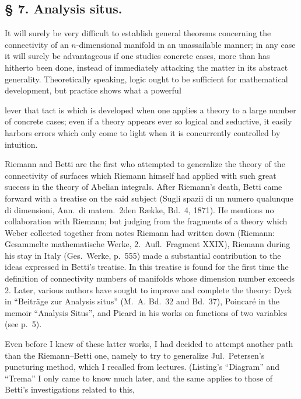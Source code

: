 \documentclass{article}
\begin{document}
\subsection*{§ 7. Analysis situs.}

It will surely be very difficult to establish general theorems concerning the connectivity of an $n$-dimensional manifold in an unassailable manner; in any case it will surely be advantageous if one studies concrete cases, more than has hitherto been done, instead of immediately attacking the matter in its abstract generality. Theoretically speaking, logic ought to be sufficient for mathematical development, but practice shows what a powerful

lever that tact is which is developed when one applies a theory to a large number of concrete cases; even if a theory appears ever so logical and seductive, it easily harbors errors which only come to light when it is concurrently controlled by intuition.

Riemann and Betti are the first who attempted to generalize the theory of the connectivity of surfaces which Riemann himself had applied with such great success in the theory of Abelian integrals. After Riemann's death, Betti came forward with a treatise on the said subject (Sugli spazii di un numero qualunque di dimensioni, Ann.\ di matem.\ 2den Række, Bd.\ 4, 1871). He mentions no collaboration with Riemann; but judging from the fragments of a theory which Weber collected together from notes Riemann had written down (Riemann: Gesammelte mathematische Werke, 2.\ Aufl.\ Fragment XXIX), Riemann during his stay in Italy (Ges.\ Werke, p.\ 555) made a substantial contribution to the ideas expressed in Betti's treatise. In this treatise is found for the first time the definition of connectivity numbers of manifolds whose dimension number exceeds 2. Later, various authors have sought to improve and complete the theory: Dyck in “Beiträge zur Analysis situs” (M.~A. Bd.\ 32 and Bd.\ 37), Poincaré in the memoir “Analysis Situs”, and Picard in his works on functions of two variables (see p.\ 5).

Even before I knew of these latter works, I had decided to attempt another path than the Riemann--Betti one, namely to try to generalize Jul.~Petersen's puncturing method, which I recalled from lectures. (Listing's “Diagram” and “Trema” I only came to know much later, and the same applies to those of Betti's investigations related to this,
\end{document}
